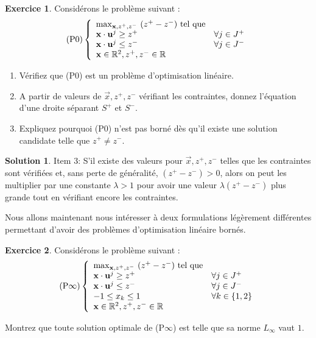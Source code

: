 \documentclass[a4paper,francais]{article}
\newcommand{\R}{{\ensuremath\mathbb{R}}}
\theoremstyle{definition}
\newtheorem{exercice}{Exercice}[section]
\newtheorem*{solution}{Solution}
\begin{document}
\begin{exercice}
  Considérons le problème suivant : 
  \[
  \text{(P0)}
  \left\{
  \begin{array}{ll}
    \max_{\vec{x},z^+,z^-} \ (z^+ - z^-) \ \text{tel que} & \\
    \vec{x} \cdot \vec{u}^j \geq z^+ & \forall j \in J^+ \\ 
    \vec{x} \cdot \vec{u}^j \leq z^- & \forall j \in J^- \\
    \vec{x} \in \R^2, z^+, z^- \in \R \\
  \end{array}
  \right.
  \]

  \begin{enumerate}
  \item Vérifiez que (P0) est un problème d'optimisation linéaire.
  \item A partir de valeurs de $\vec{x}, z^+, z^-$ vérifiant les
    contraintes, donnez l'équation d'une droite séparant $S^+$ et $S^-$. 
  \item Expliquez pourquoi (P0) n'est pas borné dès qu'il existe
    une solution candidate telle que $z^+ \neq z^-$.
  \end{enumerate}

\end{exercice}

\begin{solution}
  Item 3: 
  S'il existe des valeurs pour $\vec{x}, z^+, z^-$ telles que
  les contraintes sont vérifiées et, sans perte de généralité,
  $(z^+ - z^-) > 0$, alors on peut les multiplier par une
  constante $\lambda > 1$ pour avoir une valeur $\lambda(z^+ - z^-)$ plus
  grande tout en vérifiant encore les contraintes. 
\end{solution}

Nous allons maintenant nous intéresser à deux formulations
légèrement différentes permettant d'avoir des problèmes
d'optimisation linéaire bornés.

\begin{exercice}
  Considérons le problème suivant : 
  \[
  \text{(P$\infty$)}
  \left\{
  \begin{array}{ll}
    \max_{\vec{x},z^+,z^-} \ (z^+ - z^-) \ \text{tel que} & \\
    \vec{x} \cdot \vec{u}^j \geq z^+ & \forall j \in J^+ \\ 
    \vec{x} \cdot \vec{u}^j \leq z^- & \forall j \in J^- \\
    -1 \leq x_k \leq 1 & \forall k \in \{1, 2\} \\
    \vec{x} \in \R^2, z^+, z^- \in \R \\
  \end{array}
  \right.
  \]

  Montrez que toute solution optimale de (P$\infty$)
  est telle que sa norme $L_\infty$ vaut $1$.   
\end{exercice}
\end{document}
